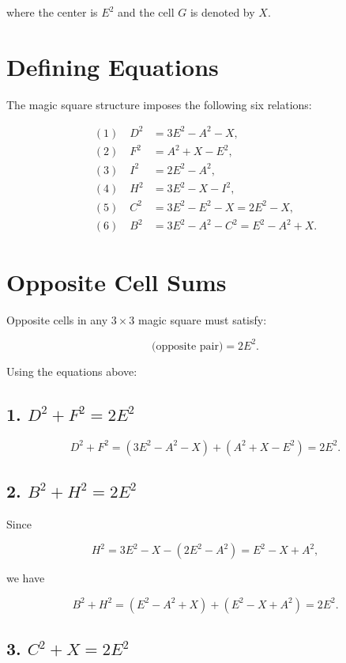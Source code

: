 \documentclass[12pt]{article}
\begin{document}
where the center is $E^2$ and the cell $G$ is denoted by $X$.

\section*{Defining Equations}

The magic square structure imposes the following six relations:

\begin{align}
(1)\quad D^2 &= 3E^2 - A^2 - X, \\
(2)\quad F^2 &= A^2 + X - E^2, \\
(3)\quad I^2 &= 2E^2 - A^2, \\
(4)\quad H^2 &= 3E^2 - X - I^2, \\
(5)\quad C^2 &= 3E^2 - E^2 - X = 2E^2 - X, \\
(6)\quad B^2 &= 3E^2 - A^2 - C^2 = E^2 - A^2 + X.
\end{align}

\section*{Opposite Cell Sums}

Opposite cells in any $3\times 3$ magic square must satisfy:



\[
\text{(opposite pair)} = 2E^2.
\]



Using the equations above:

\subsection*{1. $D^2 + F^2 = 2E^2$}



\[
D^2 + F^2
= (3E^2 - A^2 - X) + (A^2 + X - E^2)
= 2E^2.
\]



\subsection*{2. $B^2 + H^2 = 2E^2$}

Since


\[
H^2 = 3E^2 - X - (2E^2 - A^2)
= E^2 - X + A^2,
\]


we have


\[
B^2 + H^2
= (E^2 - A^2 + X) + (E^2 - X + A^2)
= 2E^2.
\]



\subsection*{3. $C^2 + X = 2E^2$}
\end{document}
